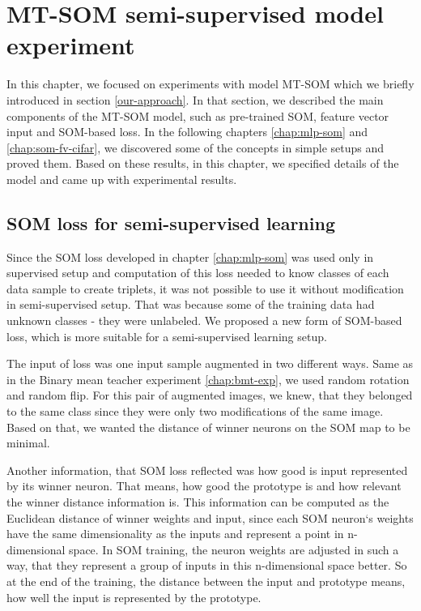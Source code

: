 \chapter{MT-SOM semi-supervised model experiment}

\label{chap:mt-exp}

In this chapter, we focused on experiments with model MT-SOM which we briefly introduced in section \ref{our-approach}. In that section, we described the main components of the MT-SOM model, such as pre-trained SOM, feature vector input and SOM-based loss. In the following chapters \ref{chap:mlp-som} and \ref{chap:som-fv-cifar}, we discovered some of the concepts in simple setups and proved them. Based on these results, in this chapter, we specified details of the model and came up with experimental results.

\section{SOM loss for semi-supervised learning}
Since the SOM loss developed in chapter \ref{chap:mlp-som} was used only in supervised setup and computation of this loss needed to know classes of each data sample to create triplets, it was not possible to use it without modification in semi-supervised setup. That was because some of the training data had unknown classes - they were unlabeled. We proposed a new form of SOM-based loss, which is more suitable for a semi-supervised learning setup.

The input of loss was one input sample augmented in two different ways. Same as in the Binary mean teacher experiment \ref{chap:bmt-exp}, we used random rotation and random flip. For this pair of augmented images, we knew, that they belonged to the same class since they were only two modifications of the same image. Based on that, we wanted the distance of winner neurons on the SOM map to be minimal. 

Another information, that SOM loss reflected was how good is input represented by its winner neuron. That means, how good the prototype is and how relevant the winner distance information is. This information can be computed as the Euclidean distance of winner weights and input, since each SOM neuron`s weights have the same dimensionality as the inputs and represent a point in n-dimensional space. In SOM training, the neuron weights are adjusted in such a way, that they represent a group of inputs in this n-dimensional space better. So at the end of the training, the distance between the input and prototype means, how well the input is represented by the prototype.


